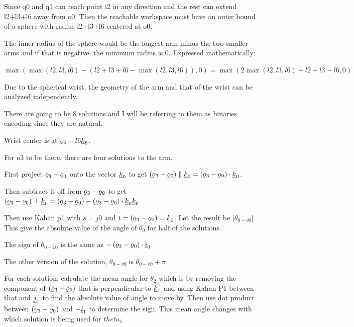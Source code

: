 \begin{solutionbox}[Q2-3]
    Since q0 and q1 can reach point i2 in any direction and the rest can extend l2+l3+l6 away from o0. Then the reachable workspace must have an outer bound of a sphere with radius l2+l3+l6 centered at o0.

    The inner radius of the sphere would be the longest arm minus the two smaller arms and if that is negative, the minimum radius is 0. Expressed mathematically:

    $\max(\max(l2,l3,l6)-(l2+l3+l6 - \max(l2,l3,l6)),0) = \max(2\max(l2,l3,l6)-l2-l3-l6,0)$
\end{solutionbox}

\begin{solutionbox}[Q2-4]
    Due to the spherical wrist, the geometry of the arm and that of the wrist can be analyzed independently.

    There are going to be 8 solutions and I will be referring to them as binaries encoding since they are natural.

    Wrist center is at $\ppori{6}-l6 \pv{k}_6$.

    For o3 to be there, there are four solutions to the arm.

    First project $\ppori{3}-\ppori{0}$ onto the vector $\underline{k}_0$ to get $\left(\ppori{3}-\ppori{0}\right) \parallel \pv{k}_0 = \left(\ppori{3}-\ppori{0}\right) \cdot \pv{k}_0$.

    Then subtract it off from $\ppori{3}-\ppori{0}$ to get  $\left(\ppori{3}-\ppori{0}\right) \perp \pv{k}_0 = \left(\ppori{3}-\ppori{0}\right) - \left(\ppori{3}-\ppori{0}\right) \cdot \pv{k}_0 \pv{k}_0$

    Then use Kahan p1 with $s = j0$ and $t = \left(\ppori{3}-\ppori{0}\right) \perp \pv{k}_0$. Let the result be $\left|\theta_{0-v0}\right|$ This give the absolute value of the angle of $\theta_0$ for half of the solutions.

    The sign of $\theta_{0-v0}$ is the same as $ - \left(\ppori{3}-\ppori{0}\right) \cdot \pv{i}_0$.

    The other version of the solution, $\theta_{0-v0}$ is $\theta_{0-v0}+\pi$

    For each solution, calculate the mean angle for $\theta_2$ which is by removing the component of $\left(\ppori{3}-\ppori{0}\right)$ that is perpendicular to $\underline{k}_1$ and using Kahan P1 between that and $\underline{j}_1$ to find the absolute value of angle to move by. Then use dot product between $\left(\ppori{3}-\ppori{0}\right)$ and $-\underline{i}_1$ to determine the sign. This mean angle changes with which solution is being used for $theta_1$


\end{solutionbox}
